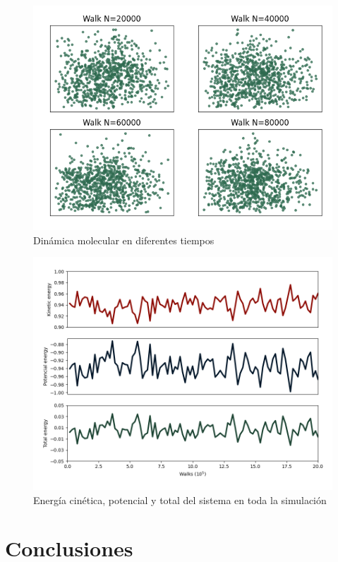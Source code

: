 \documentclass[reprint,amsmath,amssymb,aps,]{revtex4-2}
\begin{document}
\begin{figure}[H]
    \centering
    \includegraphics[scale=0.48]{../Graphics/Dim_Graphics.png}
    \caption{Dinámica molecular en diferentes tiempos}
    \label{screen dinámica}
\end{figure}
\begin{figure}[H]
    \hspace{-0.5cm}
    \includegraphics[scale=0.35]{../Graphics/Energy.png}
    \caption{Energía cinética, potencial y total del sistema en toda la simulación}
    \label{energias}
\end{figure}
\section{Conclusiones}
\end{document}
